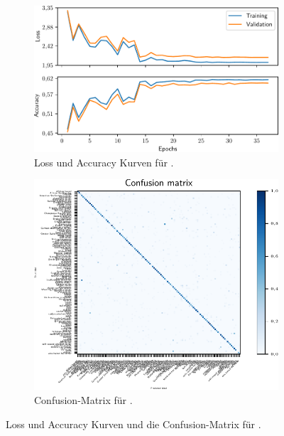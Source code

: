 \begin{figure}
  \begin{subfigure}{0.49\textwidth}
    \centering
    \includegraphics[width=\textwidth]{pics/ergebnisse/PreBigDogNN/history_epoch.pdf}
    \caption{Loss und Accuracy Kurven für \PreBig{}.}
    \label{fig:loss-acc-prebig}
  \end{subfigure}
  \qquad
  \begin{subfigure}{0.49\textwidth}
    \centering
    \includegraphics[width=\textwidth]{pics/ergebnisse/PreBigDogNN/confusion_matrix.pdf}
    \caption{Confusion-Matrix für \PreBig{}.}
    \label{fig:confusion-prebig}
  \end{subfigure}
  \caption{Loss und Accuracy Kurven und die Confusion-Matrix für \PreBig{}.}
  \label{fig:plots-prebig}
\end{figure}

